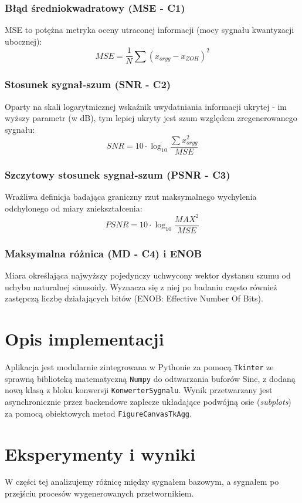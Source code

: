 \documentclass[12pt]{article}
\begin{document}
\subsubsection*{Błąd średniokwadratowy (MSE - C1)}
MSE to potężna metryka oceny utraconej informacji (mocy sygnału kwantyzacji ubocznej): 
$$MSE = \frac{1}{N} \sum (x_{oryg} - x_{ZOH})^2$$

\subsubsection*{Stosunek sygnał-szum (SNR - C2)}
Oparty na skali logarytmicznej wskaźnik uwydatniania informacji ukrytej - im wyższy parametr (w dB), tym lepiej ukryty jest szum względem zregenerowanego sygnału:
$$SNR = 10 \cdot \log_{10} \frac{\sum x_{oryg}^2}{MSE}$$

\subsubsection*{Szczytowy stosunek sygnał-szum (PSNR - C3)}
Wrażliwa definicja badająca graniczny rzut maksymalnego wychylenia odchylonego od miary zniekształcenia:
$$PSNR = 10 \cdot \log_{10} \frac{MAX^2}{MSE}$$

\subsubsection*{Maksymalna różnica (MD - C4) i ENOB}
Miara określająca najwyższy pojedynczy uchwycony wektor dystansu szumu od uchybu naturalnej sinusoidy. Wyznacza się z niej po badaniu często również zastępczą liczbę działających bitów (ENOB: Effective Number Of Bits).


\section{Opis implementacji}
Aplikacja jest modularnie zintegrowana w Pythonie za pomocą \verb|Tkinter| ze sprawną biblioteką matematyczną \verb|Numpy| do odtwarzania buforów Sinc, z dodaną nową klasą z bloku konwersji \verb|KonwerterSygnalu|. Wynik przetwarzany jest asynchronicznie przez backendowe zaplecze układające podwójną osie (\textit{subplots}) za pomocą obiektowych metod \verb|FigureCanvasTkAgg|.


\section{Eksperymenty i wyniki}
W części tej analizujemy różnicę między sygnałem bazowym, a sygnałem po przejściu procesów wygenerowanych przetwornikiem.
\end{document}
